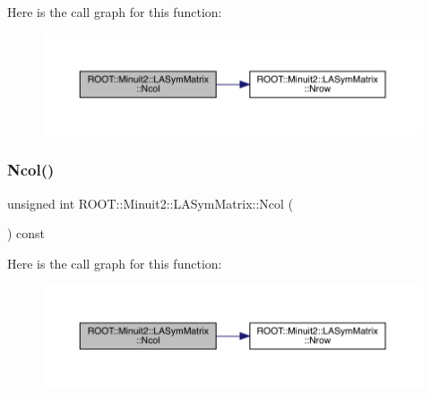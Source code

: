 Here is the call graph for this function\+:
\nopagebreak
\begin{figure}[H]
\begin{center}
\leavevmode
\includegraphics[width=350pt]{d3/d72/classROOT_1_1Minuit2_1_1LASymMatrix_a36bb0f349110a80cb742953ae68fc9c5_cgraph}
\end{center}
\end{figure}
\mbox{\label{classROOT_1_1Minuit2_1_1LASymMatrix_a36bb0f349110a80cb742953ae68fc9c5}} 
\subsubsection{\texorpdfstring{Ncol()}{Ncol()}\hspace{0.1cm}{\footnotesize\ttfamily [2/2]}}
{\footnotesize\ttfamily unsigned int R\+O\+O\+T\+::\+Minuit2\+::\+L\+A\+Sym\+Matrix\+::\+Ncol (\begin{DoxyParamCaption}{ }\end{DoxyParamCaption}) const\hspace{0.3cm}{\ttfamily [inline]}}

Here is the call graph for this function\+:
\nopagebreak
\begin{figure}[H]
\begin{center}
\leavevmode
\includegraphics[width=350pt]{d3/d72/classROOT_1_1Minuit2_1_1LASymMatrix_a36bb0f349110a80cb742953ae68fc9c5_cgraph}
\end{center}
\end{figure}
\mbox{\label{classROOT_1_1Minuit2_1_1LASymMatrix_ac76b44933bc4b144b8671c089b8d7ef5}} 
